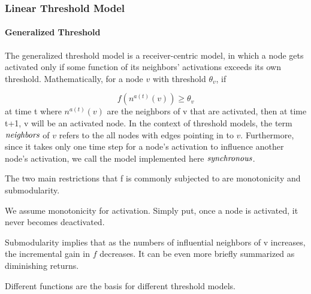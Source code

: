 \documentclass[11pt]{article}
\begin{document}
    \hypertarget{linear-threshold-model}{%
\subsubsection{Linear Threshold Model}\label{linear-threshold-model}}

    \hypertarget{generalized-threshold}{%
\paragraph{Generalized Threshold}\label{generalized-threshold}}

The generalized threshold model is a receiver-centric model, in which a
node gets activated only if some function of its neighbors' activations
exceeds its own threshold. Mathematically, for a node \(v\) with
threshold \(\theta_v\), if

\[ f(n^{a(t)}(v)) \ge \theta_v\] at time t where \(n^{a(t)}(v)\) are the
neighbors of v that are activated, then at time t+1, v will be an
activated node. In the context of threshold models, the term
\(\it neighbors\) of \(v\) refers to the all nodes with edges pointing
in to \(v\). Furthermore, since it takes only one time step for a node's
activation to influence another node's activation, we call the model
implemented here \(\it synchronous\).

The two main restrictions that f is commonly subjected to are
monotonicity and submodularity.

We assume monotonicity for activation. Simply put, once a node is
activated, it never becomes deactivated.

Submodularity implies that as the numbers of influential neighbors of v
increases, the incremental gain in \(f\) decreases. It can be even more
briefly summarized as diminishing returns.

Different functions are the basis for different threshold models.
\end{document}
